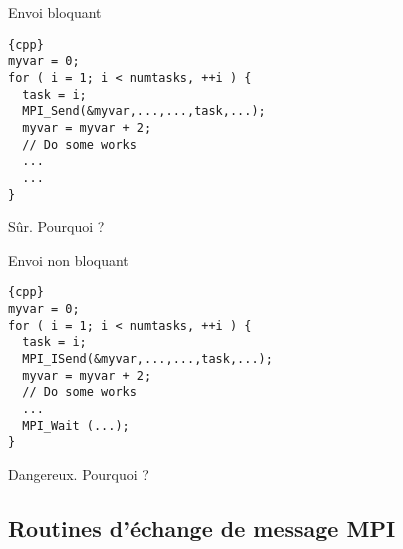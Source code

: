 \documentclass[11pt,a4paper]{article}
\begin{document}
\begin{minipage}{8cm}
\begin{center}Envoi bloquant\end{center}

\begin{lstlisting}{cpp}
myvar = 0;
for ( i = 1; i < numtasks, ++i ) {
  task = i;
  MPI_Send(&myvar,...,...,task,...);
  myvar = myvar + 2;
  // Do some works
  ...
  ...
}
\end{lstlisting}

\begin{center}Sûr. Pourquoi ?\end{center}
\end{minipage}
\begin{minipage}{8cm}
\begin{center}Envoi non bloquant\end{center}

\begin{lstlisting}{cpp}
myvar = 0;
for ( i = 1; i < numtasks, ++i ) {
  task = i;
  MPI_ISend(&myvar,...,...,task,...);
  myvar = myvar + 2;
  // Do some works
  ...
  MPI_Wait (...);
}
\end{lstlisting}

\begin{center}Dangereux. Pourquoi ?\end{center}
\end{minipage}

\subsection{Routines d'échange de message MPI}
\end{document}
